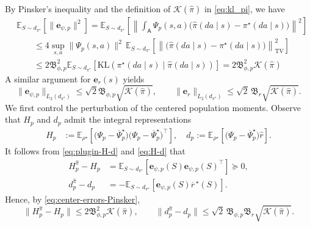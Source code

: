 \documentclass{article}
\theoremstyle{definition}
\theoremstyle{remark}
\theoremstyle{plain}
\newcommand{\E}{\mathbb{E}}
\newcommand{\KL}{\mathrm{KL}}
\newcommand{\dsieve}{p}
\numberwithin{equation}{section}
\begin{document}
By Pinsker's inequality and the definition of \(\mathcal K(\widehat\pi)\) in \eqref{eq:kl_pi}, we have
\begin{align}
    &\E_{S\sim d_{\pi^\star}} [\|\mathbf{e}_{\psi,\dsieve}\|^2] 
    = \E_{S\sim d_{\pi^\star}} \left[\left\| \int_{\mathsf A}\Psi_{\dsieve} (s,a) \big(\widehat \pi (da\mid s) -  \pi^\star (da\mid s)\big) \right\|^2\right]\\
    &\qquad\le  4\sup_{s,a}\|\Psi_\dsieve(s,a)\|^2\,\E_{S\sim d_{\pi^\star}} \left[\left\|  \big(\widehat \pi (da\mid s) -  \pi^\star (da\mid s)\big) \right\|_{\operatorname{TV}}^2\right]\\
    &\qquad\le 2  \mathfrak B_{\phi,\dsieve}^2\E_{S\sim d_{\pi^\star}} \left[\KL( \pi^\star (da\mid s)\mid \widehat \pi (da\mid s)) \right] =  2  \mathfrak B_{\phi,\dsieve}^2 \mathcal K(\widehat\pi)
\end{align}
A similar argument for \(\mathbf{e}_r(s)\) yields
\begin{equation}
\label{eq:center-errors-Pinsker}
    \|\mathbf{e}_{\psi,\dsieve}\|_{L_2(d_{\pi^\star})}
    \leq
    \sqrt{2} \mathfrak B_{\phi,\dsieve}\sqrt{\mathcal K(\widehat\pi)},
    \qquad
    \|\mathbf{e}_r\|_{L_2(d_{\pi^\star})}
    \leq
    \sqrt{2}\, \mathfrak B_r\sqrt{\mathcal K(\widehat\pi)}.
\end{equation}
We first control the perturbation of the centered population moments. Observe that \(H_\dsieve\) and \(d_\dsieve\) admit the integral representations
\begin{align}
\label{eq:H-d}
    H_\dsieve
    &:=
    \mathbb E_{\rho^\star}
    \left[
        \big(\Psi_\dsieve-\overline\Psi_\dsieve^{\star}\big)
        \big(\Psi_\dsieve-\overline\Psi_\dsieve^{\star}\big)^\top
    \right],\quad
    d_\dsieve
    :=
    \mathbb E_{\rho^\star}
    \left[
        \big(\Psi_\dsieve-\overline\Psi_\dsieve^{\star}\big)
        \widehat r
    \right].
\end{align}
It follows from \eqref{eq:plugin-H-d} and \eqref{eq:H-d} that
\begin{align}
\label{eq:plugin-H-exact-difference}
    H_\dsieve^{\widehat\pi}-H_\dsieve
    &=
    \mathbb E_{S\sim d_{\pi^\star}}
    \left[
        \mathbf{e}_{\psi,\dsieve}(S)
        \mathbf{e}_{\psi,\dsieve}(S)^\top
    \right]
    \succeq 0,
    \\
\label{eq:plugin-d-exact-difference}
    d_\dsieve^{\widehat\pi}-d_\dsieve
    &=
    -
    \mathbb E_{S\sim d_{\pi^\star}}
    \left[
        \mathbf{e}_{\psi,\dsieve}(S)
        \overline r^{\,\star}(S)
    \right].
\end{align}
Hence, by \eqref{eq:center-errors-Pinsker},
\begin{equation}
\label{eq:plugin-H-d-bounds}
    \|H_\dsieve^{\widehat\pi}-H_\dsieve\|
    \leq
    2\mathfrak {B}_{\phi,\dsieve}^2\mathcal K(\widehat\pi),
    \qquad
    \|d_\dsieve^{\widehat\pi}-d_\dsieve\|
    \leq
    \sqrt{2}\,\mathfrak {B}_{\phi,\dsieve}\mathfrak B_r
    \sqrt{\mathcal K(\widehat\pi)}.
\end{equation}
\end{document}
